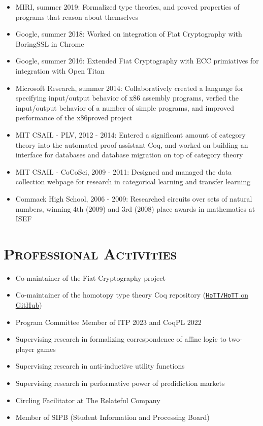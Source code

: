 \documentclass[11pt]{res}
\begin{document}
\begin{itemize}
\item MIRI, summer 2019: Formalized type theories, and proved properties of programs that reason about themselves
\item Google, summer 2018: Worked on integration of Fiat Cryptography with BoringSSL in Chrome
\item Google, summer 2016: Extended Fiat Cryptography with ECC primiatives for integration with Open Titan
\item Microsoft Research, summer 2014: Collaboratively created a language for specifying input/output behavior of x86 assembly programs, verfied the input/output behavior of a number of simple programs, and improved performance of the x86proved project
\item MIT CSAIL - PLV, 2012 - 2014: Entered a significant amount of category theory into the automated proof assistant Coq, and worked on building an interface for databases and database migration on top of category theory
\item MIT CSAIL - CoCoSci, 2009 - 2011: Designed and managed the data collection webpage for research in categorical learning and transfer learning
\item Commack High School, 2006 - 2009: Researched circuits over sets of natural numbers, winning 4th (2009) and 3rd (2008) place awards in mathematics at ISEF
\end{itemize}

\section{\textsc{Professional Activities}}

\begin{itemize}
\item Co-maintainer of the Fiat Cryptography project
\item Co-maintainer of the homotopy type theory Coq repository (\href{https://github.com/HoTT/HoTT}{\texttt{HoTT/HoTT} on GitHub})
\item Program Committee Member of ITP 2023 and CoqPL 2022
\item Supervising research in formalizing correspondence of affine logic to two-player games
\item Supervising research in anti-inductive utility functions
\item Supervising research in performative power of predidiction markets
\item Circling Facilitator at The Relateful Company
\item Member of SIPB (Student Information and Processing Board)
\end{itemize}
\end{document}
